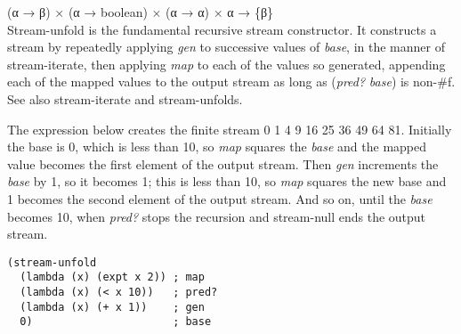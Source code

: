 \begin{entry}{%
  }

  (α → β) × (α → boolean) × (α → α) × α → \{β\}\\
  Stream-unfold is the fundamental recursive stream constructor. It
  constructs a stream by repeatedly applying \emph{gen} to successive
  values of \emph{base}, in the manner of stream-iterate, then
  applying \emph{map} to each of the values so generated, appending
  each of the mapped values to the output stream as long as
  (\emph{pred?} \emph{base}) is non-\#f. See also stream-iterate and
  stream-unfolds.

  The expression below creates the finite stream 0 1 4 9 16 25 36 49
  64 81. Initially the base is 0, which is less than 10, so \emph{map}
  squares the \emph{base} and the mapped value becomes the first
  element of the output stream. Then \emph{gen} increments the
  \emph{base} by 1, so it becomes 1; this is less than 10, so
  \emph{map} squares the new base and 1 becomes the second element of
  the output stream. And so on, until the \emph{base} becomes 10, when
  \emph{pred?} stops the recursion and stream-null ends the output
  stream.

\begin{verbatim}
(stream-unfold
  (lambda (x) (expt x 2)) ; map
  (lambda (x) (< x 10))   ; pred?
  (lambda (x) (+ x 1))    ; gen
  0)                      ; base
\end{verbatim}
\end{entry}

